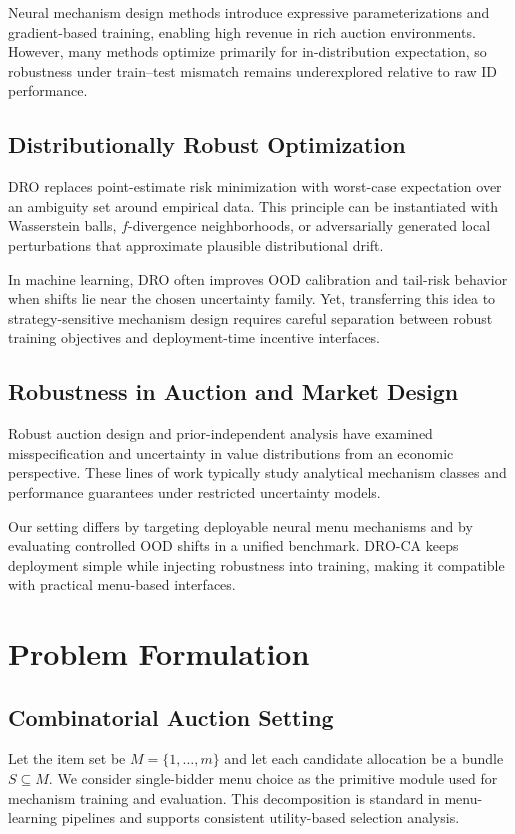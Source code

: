 \documentclass{article}
\begin{document}
Neural mechanism design methods introduce expressive parameterizations and gradient-based training, enabling high revenue in rich auction environments. However, many methods optimize primarily for in-distribution expectation, so robustness under train--test mismatch remains underexplored relative to raw ID performance.

\subsection{Distributionally Robust Optimization}
DRO replaces point-estimate risk minimization with worst-case expectation over an ambiguity set around empirical data. This principle can be instantiated with Wasserstein balls, $f$-divergence neighborhoods, or adversarially generated local perturbations that approximate plausible distributional drift.

In machine learning, DRO often improves OOD calibration and tail-risk behavior when shifts lie near the chosen uncertainty family. Yet, transferring this idea to strategy-sensitive mechanism design requires careful separation between robust training objectives and deployment-time incentive interfaces.

\subsection{Robustness in Auction and Market Design}
Robust auction design and prior-independent analysis have examined misspecification and uncertainty in value distributions from an economic perspective. These lines of work typically study analytical mechanism classes and performance guarantees under restricted uncertainty models.

Our setting differs by targeting deployable neural menu mechanisms and by evaluating controlled OOD shifts in a unified benchmark. DRO-CA keeps deployment simple while injecting robustness into training, making it compatible with practical menu-based interfaces.

\section{Problem Formulation}
\subsection{Combinatorial Auction Setting}
Let the item set be $M=\{1,\dots,m\}$ and let each candidate allocation be a bundle $S\subseteq M$. We consider single-bidder menu choice as the primitive module used for mechanism training and evaluation. This decomposition is standard in menu-learning pipelines and supports consistent utility-based selection analysis.
\end{document}
